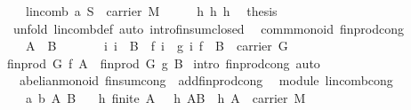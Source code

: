 \begin{isabellebody}
\ \ \ {\isachardoublequoteopen}lincomb\ a\ S\ {\isasymin}\ carrier\ M{\isachardoublequoteclose}\isanewline
%
\isadelimproof
%
\endisadelimproof
%
\isatagproof
{}\isamarkupfalse%
\ {\isacharminus}\isanewline
\ \ \isamarkupfalse%
\ h{}\ h{}\ h{}\ \isamarkupfalse%
\ {\isacharquery}thesis\ \isamarkupfalse%
\ {\isacharparenleft}unfold\ lincomb{\isacharunderscore}def{\isacharcomma}\ auto\ intro{\isacharcolon}finsum{\isacharunderscore}closed{\isacharparenright}\isanewline
\isanewline
{}\isamarkupfalse%
%
\endisatagproof
{\isafoldproof}%
%
\isadelimproof
\isanewline
%
\endisadelimproof
\isanewline
{}\isamarkupfalse%
\ {\isacharparenleft}\ comm{\isacharunderscore}monoid{\isacharparenright}\ finprod{\isacharunderscore}cong{}{\isacharcolon}\isanewline
\ \ {\isachardoublequoteopen}{\isacharbrackleft}{\isacharbar}\ A\ {\isacharequal}\ B{\isacharsemicolon}\ \isanewline
\ \ \ \ \ \ {\isacharbang}{\isacharbang}i{\isachardot}\ i\ {\isasymin}\ B\ {\isacharequal}{\isacharequal}{\isachargreater}\ f\ i\ {\isacharequal}\ g\ i{\isacharsemicolon}\ f\ {\isasymin}\ B\ {\isacharminus}{\isachargreater}\ carrier\ G{\isacharbar}{\isacharbrackright}\ {\isacharequal}{\isacharequal}{\isachargreater}\ \isanewline
finprod\ G\ f\ A\ {\isacharequal}\ finprod\ G\ g\ B{\isachardoublequoteclose}\isanewline
%
\isadelimproof
%
\endisadelimproof
%
\isatagproof
{}\isamarkupfalse%
\ {\isacharparenleft}intro\ finprod{\isacharunderscore}cong{\isacharcomma}\ auto{\isacharparenright}%
\endisatagproof
{\isafoldproof}%
%
\isadelimproof
\isanewline
%
\endisadelimproof
\isanewline
{}\isamarkupfalse%
\ {\isacharparenleft}\ abelian{\isacharunderscore}monoid{\isacharparenright}\ finsum{\isacharunderscore}cong{}\ {\isacharequal}\ add{\isachardot}finprod{\isacharunderscore}cong{}\isanewline
\isanewline
{}\isamarkupfalse%
\ {\isacharparenleft}\ module{\isacharparenright}\ lincomb{\isacharunderscore}cong{\isacharcolon}\isanewline
\ \ \ a\ b\ A\ B\isanewline
\ \ \ h{}{\isacharcolon}\ {\isachardoublequoteopen}finite\ {\isacharparenleft}A{\isacharparenright}{\isachardoublequoteclose}\ \ \ h{}{\isacharcolon}\ {\isachardoublequoteopen}A{\isacharequal}B{\isachardoublequoteclose}\ \ h{}{\isacharcolon}\ {\isachardoublequoteopen}A\ {\isasymsubseteq}\ carrier\ M{\isachardoublequoteclose}\ \isanewline

\end{isabellebody}

